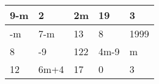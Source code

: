 \begin{table}[]
\begin{tabular}{|l|l|l|l|l|}
\hline
9-m & 2    & 2m  & 19   & 3    \\ \hline
-m  & 7-m  & 13  & 8    & 1999 \\ \hline
8   & -9   & 122 & 4m-9 & m    \\ \hline
12  & 6m+4 & 17  & 0    & 3    \\ \hline
\end{tabular}
\label{moje}
\end{table}